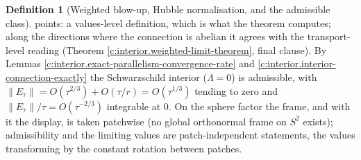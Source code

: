 \documentclass[11pt]{article}
\theoremstyle{definition}
\newtheorem{definition}[theorem]{Definition}
\theoremstyle{plain}
\begin{document}
\begin{definition}[Weighted blow-up, Hubble normalisation, and the admissible class]
points: a values-level definition, which is what the theorem computes; along the directions where the connection is abelian it agrees with the transport-level reading (Theorem \ref{c:interior.weighted-limit-theorem}, final clause). By Lemmas \ref{c:interior.exact-parallelism-convergence-rate} and \ref{c:interior.interior-connection-exactly} the Schwarzschild interior ($\Lambda = 0$) is admissible, with $\|E_\tau\| = O(\tau^{2/3}) + O(\tau/r) = O(\tau^{1/3})$ tending to zero and $\|E_\tau\|/\tau = O(\tau^{-2/3})$ integrable at $0$. On the sphere factor the frame, and with it the display, is taken patchwise (no global orthonormal frame on $S^2$ exists); admissibility and the limiting values are patch-independent statements, the values transforming by the constant rotation between patches.
\end{definition}
\end{document}
